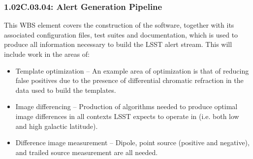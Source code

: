 \subsubsection{1.02C.03.04: Alert Generation Pipeline}

This WBS element covers the construction of the software,
together with its associated configuration files, test suites and
documentation, which is used to produce all information necessary to
build the LSST alert stream.  This will include work in the areas of:

\begin{itemize}

\item Template optimization -- An example area of optimization is that of reducing
false positives due to the presence of differential chromatic refraction in the
data used to build the templates.
\item Image differencing -- Production of algorithms needed to produce optimal
image differences in all contexts LSST expects to operate in (i.e. both low and high galactic
latitude).
\item Difference image measurement -- Dipole, point source (positive and negative), and trailed source
measurement are all needed.

\end{itemize}
